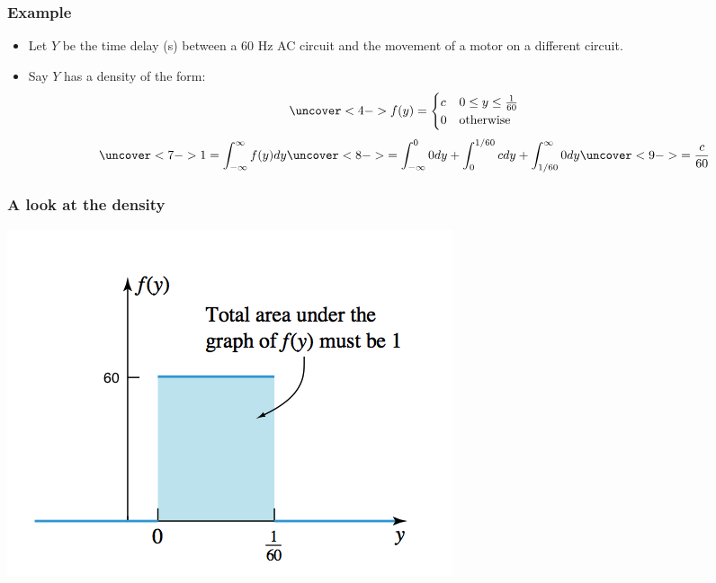 \documentclass[handout]{beamer}\usepackage[]{graphicx}\usepackage[]{color}
\numberwithin{equation}{section}
\begin{document}
\begin{frame}
\frametitle{Example} \small
\begin{itemize}
\pause \item Let $Y$ be the time delay (s) between a 60 Hz AC circuit and the movement of a motor on a different circuit.
\pause \item Say $Y$ has a density of the form:
\begin{align*}
\uncover<4->{f(y) = \begin{cases}
c & 0 \le y \le \frac{1}{60}\\
0 & \text{otherwise}
\end{cases}}
\end{align*}
\begin{align*}
\uncover<7->{1 = \int_{- \infty}^\infty f(y) dy}  \uncover<8->{= \int_{- \infty}^0 0 dy  + \int_0^{1/60} c dy + \int_{1/60}^\infty 0 dy } \uncover<9->{= \frac{c}{60}}
\end{align*}
\end{itemize}
\end{frame}

\begin{frame}
\frametitle{A look at the density}
 \includegraphics{../../fig/delaypict.png}
\end{frame}
\end{document}
